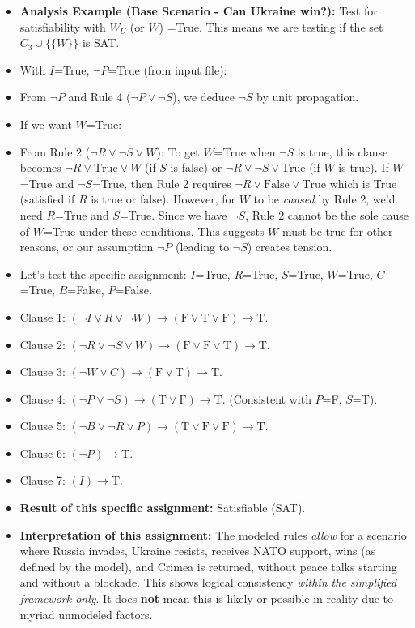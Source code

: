 \documentclass[11pt, a4paper]{article}
\begin{document}
\begin{itemize}
    \item \textbf{Analysis Example (Base Scenario - Can Ukraine win?):} Test for satisfiability with $W_U$ (or $W$) =True.
        This means we are testing if the set $C_3 \cup \{\{W\}\}$ is SAT.
        \item With $I$=True, $\neg P$=True (from input file):
            \item From $\neg P$ and Rule 4 ($\neg P \vee \neg S$), we deduce $\neg S$ by unit propagation.
            \item If we want $W$=True:
                \item From Rule 2 ($\neg R \vee \neg S \vee W$): To get $W$=True when $\neg S$ is true, this clause becomes $\neg R \vee \text{True} \vee W$ (if $S$ is false) or $\neg R \vee \neg S \vee \text{True}$ (if $W$ is true).
                If $W$=True and $\neg S$=True, then Rule 2 requires $\neg R \vee \text{False} \vee \text{True}$ which is True (satisfied if $R$ is true or false).
                However, for $W$ to be \textit{caused} by Rule 2, we'd need $R$=True and $S$=True. Since we have $\neg S$, Rule 2 cannot be the sole cause of $W$=True under these conditions. This suggests $W$ must be true for other reasons, or our assumption $\neg P$ (leading to $\neg S$) creates tension.
        \item Let's test the specific assignment: $I$=True, $R$=True, $S$=True, $W$=True, $C$=True, $B$=False, $P$=False.
            \item Clause 1: $(\neg I \vee R \vee \neg W) \rightarrow (\text{F} \vee \text{T} \vee \text{F}) \rightarrow \text{T}$.
            \item Clause 2: $(\neg R \vee \neg S \vee W) \rightarrow (\text{F} \vee \text{F} \vee \text{T}) \rightarrow \text{T}$.
            \item Clause 3: $(\neg W \vee C) \rightarrow (\text{F} \vee \text{T}) \rightarrow \text{T}$.
            \item Clause 4: $(\neg P \vee \neg S) \rightarrow (\text{T} \vee \text{F}) \rightarrow \text{T}$. (Consistent with $P$=F, $S$=T).
            \item Clause 5: $(\neg B \vee \neg R \vee P) \rightarrow (\text{T} \vee \text{F} \vee \text{F}) \rightarrow \text{T}$.
            \item Clause 6: $(\neg P) \rightarrow \text{T}$.
            \item Clause 7: $(I) \rightarrow \text{T}$.
        \item \textbf{Result of this specific assignment:} Satisfiable (SAT).
        \item \textbf{Interpretation of this assignment:} The modeled rules \textit{allow} for a scenario where Russia invades, Ukraine resists, receives NATO support, wins (as defined by the model), and Crimea is returned, without peace talks starting and without a blockade. This shows logical consistency \textit{within the simplified framework only}. It does \textbf{not} mean this is likely or possible in reality due to myriad unmodeled factors.


\end{itemize}
\end{document}

